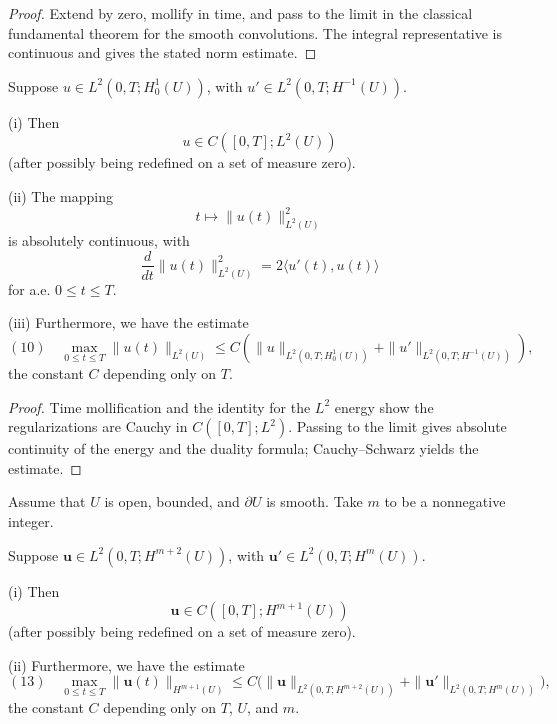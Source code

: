 \begin{proof}
\sketch Extend by zero, mollify in time, and pass to the limit in the classical fundamental theorem for the smooth convolutions. The integral representative is continuous and gives the stated norm estimate.
\end{proof}

\begin{theorem}
\label{thm:more-calculus-h1-hminus1}

Suppose $u \in L^2(0,T;H_0^1(U))$, with $u' \in L^2(0,T;H^{-1}(U))$.

(i) Then
$$u \in C([0,T];L^2(U))$$
(after possibly being redefined on a set of measure zero).

(ii) The mapping
$$t \mapsto \|u(t)\|^2_{L^2(U)}$$
is absolutely continuous, with
$$\frac{d}{dt}\|u(t)\|^2_{L^2(U)} = 2\langle u'(t), u(t)\rangle$$
for a.e. $0 \le t \le T$.

(iii) Furthermore, we have the estimate
$$(10) \quad \max_{0 \le t \le T} \|u(t)\|_{L^2(U)} \le C\left(\|u\|_{L^2(0,T;H_0^1(U))} + \|u'\|_{L^2(0,T;H^{-1}(U))}\right),$$
the constant $C$ depending only on $T$.
\end{theorem}

\begin{proof}
\sketch Time mollification and the identity for the $L^2$ energy show the regularizations are Cauchy in $C([0,T];L^2)$. Passing to the limit gives absolute continuity of the energy and the duality formula; Cauchy--Schwarz yields the estimate.
\end{proof}

\begin{theorem}
\label{thm:mappings-into-better-spaces}

Assume that $U$ is open, bounded, and $\partial U$ is smooth. Take $m$ to be a nonnegative integer.

Suppose $\mathbf{u} \in L^2(0,T;H^{m+2}(U))$, with $\mathbf{u}' \in L^2(0,T;H^m(U))$.

(i) Then
$$\mathbf{u} \in C([0,T];H^{m+1}(U))$$
(after possibly being redefined on a set of measure zero).

(ii) Furthermore, we have the estimate
$$(13) \quad \max_{0 \le t \le T} \|\mathbf{u}(t)\|_{H^{m+1}(U)} \le C\bigl(\|\mathbf{u}\|_{L^2(0,T;H^{m+2}(U))} + \|\mathbf{u}'\|_{L^2(0,T;H^m(U))}\bigr),$$
the constant $C$ depending only on $T$, $U$, and $m$.
\end{theorem}


